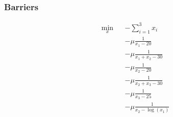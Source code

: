 \documentclass[paper=a4, fontsize=11pt]{scrartcl} %
\numberwithin{equation}{section} %
\numberwithin{figure}{section} %
\numberwithin{table}{section} %
\begin{document}

\subsubsection{Barriers}

\begin{equation}
	\begin{aligned}
		& \underset{x}{\text{min}}
		& & -\sum_{i=1}^{3} x_i \\
		& & & - \mu\frac{1}{x_1 - 20} \\
		& & & - \mu\frac{1}{x_1 + x_2 - 30} \\
		& & & - \mu\frac{1}{x_2 - 20} \\
		& & & - \mu\frac{1}{x_2 + x_3 - 30} \\
		& & & - \mu\frac{1}{x_3 - 25} \\
		& & & - \mu\frac{1}{x_2 - \log(x_1)} \\
	\end{aligned}					
\end{equation}

\end{document}
